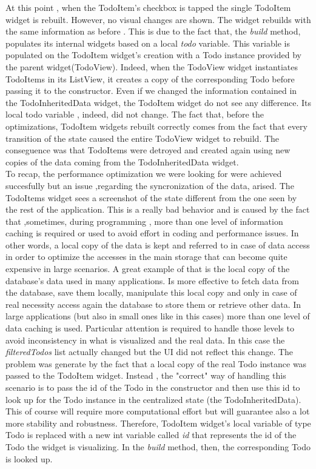 At this point , when the TodoItem’s checkbox is tapped the single TodoItem widget is rebuilt. However, no visual changes are shown. The widget rebuilds with the same information as before . This is due to the fact that, the \textit{build} method, populates its internal widgets based on a local \textit{todo} variable. This variable is populated on the TodoItem widget's creation with a Todo instance provided by the parent widget(TodoView). Indeed, when the TodoView widget instantiates TodoItems  in its ListView, it creates a copy of the corresponding Todo before passing it to the constructor. Even if we changed the information contained in the TodoInheritedData widget, the TodoItem widget do not see any difference.  Its local todo variable , indeed, did not change. The fact that, before the optimizations, TodoItem widgets rebuilt correctly comes from the fact that every transition of the state caused the entire TodoView widget to rebuild. The conseguence was that TodoItems were detroyed and created again using new copies of the data coming from the TodoInheritedData widget. \\
To recap, the performance optimization we were looking for were achieved succesfully but an issue ,regarding the syncronization of the data, arised. The TodoItems widget sees a screenshot of the state different from the one seen by the rest of the application. This is a really bad behavior and is caused by the fact that ,sometimes, during programming , more than one level of information caching is required or used to avoid effort in coding and performance issues. In other words, a local copy of the data is kept and referred to in case of data access in order to optimize the accesses in the main storage that can become quite expensive in large scenarios. A great example of that is the local copy of the database’s data used in many applications. Is more effective to fetch data from the database, save them locally, manipulate this local copy and only in case of real necessity access again the database to store them or retrieve other data. In large applications (but also in small ones like in this cases) more than one level of data caching is used. Particular attention is required to handle those levels to avoid inconsistency in what is visualized and the real data. In this case the \textit{filteredTodos} list actually changed but the UI did not reflect this change. The problem was generate by the fact that a local copy of the real Todo instance was passed to the TodoItem widget. Instead , the "correct" way of handling this scenario is to pass the id of the Todo in the constructor and then use this id to look up for the Todo instance in the centralized state (the TodoInheritedData). This of course will require more computational effort but  will guarantee also a lot more stability and robustness. 
Therefore, TodoItem widget's local variable of type Todo is replaced with a new int variable called \textit{id} that represents the id of the Todo the widget is visualizing. In the \textit{build} method, then, the corresponding Todo is looked up.


